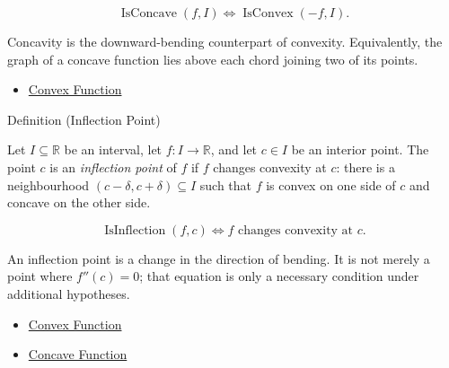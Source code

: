 \begin{remark*}
\[
  \operatorname{IsConcave}(f,I)
  \Longleftrightarrow
  \operatorname{IsConvex}(-f,I).
\]
\end{remark*}

\begin{remark*}[Interpretation]
Concavity is the downward-bending counterpart of convexity. Equivalently, the graph of a concave function lies above each chord joining two of its points.
\end{remark*}

\begin{dependencies}
\begin{itemize}
  \item \hyperref[def:convex-function]{Convex Function}
\end{itemize}
\end{dependencies}

\begin{definitionbox}{Definition (Inflection Point)}
\begin{definition}
\label{def:inflection-point}
Let $I\subseteq\mathbb{R}$ be an interval, let $f:I\to\mathbb{R}$, and let $c\in I$ be an interior point. The point $c$ is an \emph{inflection point} of $f$ if $f$ changes convexity at $c$: there is a neighbourhood $(c-\delta,c+\delta)\subseteq I$ such that $f$ is convex on one side of $c$ and concave on the other side.
\end{definition}
\end{definitionbox}

\begin{remark*}
\[
  \operatorname{IsInflection}(f,c)
  \Longleftrightarrow
  f \text{ changes convexity at } c.
\]
\end{remark*}

\begin{remark*}[Interpretation]
An inflection point is a change in the direction of bending. It is not merely a point where $f''(c)=0$; that equation is only a necessary condition under additional hypotheses.
\end{remark*}

\begin{dependencies}
\begin{itemize}
  \item \hyperref[def:convex-function]{Convex Function}
  \item \hyperref[def:concave-function]{Concave Function}
\end{itemize}
\end{dependencies}
